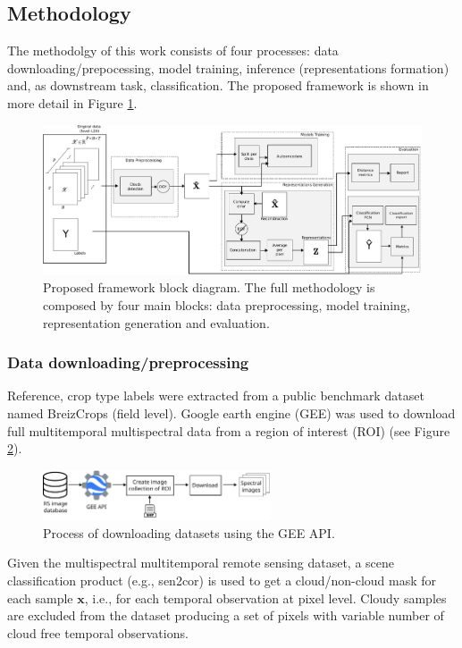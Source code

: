 \documentclass[journal,article,submit,pdftex,moreauthors]{Definitions/mdpi}
\begin{document}
\subsection{Methodology}
The methodolgy of this work consists of four processes: data downloading/prepocessing, model training, inference (representations formation) and, as downstream task, classification. The proposed framework is shown in more detail in Figure \ref{abstract}.
\begin{figure}[h!]
	\centering
	\includegraphics[width=\textwidth]{figures/abstract.pdf}
	\caption{Proposed framework block diagram. The full methodology is composed by four main blocks: data preprocessing, model training, representation generation and evaluation.} 
	\label{abstract}
\end{figure}
\subsubsection{Data downloading/preprocessing}\label{data_preprocessing}
Reference, crop type labels were extracted from a public benchmark dataset named BreizCrops \cite{Russwurm2020} (field level).
Google earth engine (GEE) was used to download full multitemporal multispectral data from a region of interest (ROI) (see Figure \ref{GEE_process}). \\
\begin{figure}[H]
	\centering
	\includegraphics[width=0.6\textwidth]{figures/gee_download.pdf}
	\caption{Process of downloading datasets using the GEE API.}
	\label{GEE_process}    
\end{figure}

Given the multispectral multitemporal remote sensing dataset, a scene classification product (e.g., sen2cor) is used to get a cloud/non-cloud mask for each sample $\mathbf{x}$, i.e., for each temporal observation at pixel level.
Cloudy samples are excluded from the dataset producing a set of pixels with variable number of cloud free temporal observations.
\end{document}
